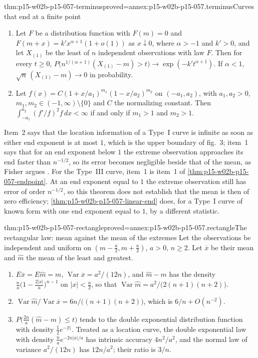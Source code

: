 \begin{hbtheorem}{thm:p15-w02b-p15-057-terminus}{proved=annex:p15-w02b-p15-057.terminus}{Curves that end at a finite point}
\begin{enumerate}
\item Let \(F\) be a distribution function with \(F(m)=0\) and
 \(F(m+x)=k'x^{\alpha+1}(1+o(1))\) as \(x\downarrow0\), where
 \(\alpha>-1\) and \(k'>0\), and let \(X_{(1)}\) be the least of \(n\)
 independent observations with law \(F\). Then for every \(t\geq0\),
 \(P\bigl(n^{1/(\alpha+1)}(X_{(1)}-m)>t\bigr)\to\exp(-k't^{\alpha+1})\).
 If \(\alpha<1\), \(\sqrt n\,(X_{(1)}-m)\to0\) in probability.
\item Let \(f(x)=C(1+x/a_1)^{m_1}(1-x/a_2)^{m_2}\) on \((-a_1,a_2)\), with
 \(a_1,a_2>0\), \(m_1,m_2\in(-1,\infty)\setminus\{0\}\) and \(C\) the
 normalizing constant. Then
 \(\int_{-a_1}^{a_2}(f'/f)^2f\,dx<\infty\) if and only if \(m_1>1\) and
 \(m_2>1\).
\end{enumerate}
\end{hbtheorem}

Item~2 says that the location information of a Type~I curve is infinite as
soon as either end exponent is at most \(1\), which is the upper boundary of
fig.~3; item~1 says that for an end exponent below \(1\) the extreme
observation approaches its end faster than \(n^{-1/2}\), so its error
becomes negligible beside that of the mean, as Fisher argues
\cite[p.~348]{Fisher1922Foundations}. For the Type~III curve, item~1 is
item~1 of \cref{thm:p15-w02b-p15-057-endpoint}. At an end exponent equal
to \(1\) the extreme observation still has error of order \(n^{-1/2}\), so
this theorem does not establish that the mean is then of zero efficiency;
\cref{thm:p15-w02b-p15-057-linear-end} does, for a Type~I curve of known
form with one end exponent equal to \(1\), by a different statistic.

\begin{hbtheorem}{thm:p15-w02b-p15-057-rectangle}{proved=annex:p15-w02b-p15-057.rectangle}{The rectangular law: mean against the mean of the extremes}
Let the observations be independent and uniform on
\((m-\frac a2,m+\frac a2)\), \(a>0\), \(n\geq2\). Let \(\overline x\) be
their mean and \(\hat m\) the mean of the least and greatest.
\begin{enumerate}
\item \(E\overline x=E\hat m=m\), \(\operatorname{Var}\overline x
 =a^2/(12n)\), and \(\hat m-m\) has the density
 \(\frac na\bigl(1-\frac{2|x|}a\bigr)^{n-1}\) on \(|x|<\frac a2\), so that
 \(\operatorname{Var}\hat m=a^2/\bigl(2(n+1)(n+2)\bigr)\).
\item \(\operatorname{Var}\hat m/\operatorname{Var}\overline x
 =6n/\bigl((n+1)(n+2)\bigr)\), which is \(6/n+O(n^{-2})\).
\item \(P\bigl(\frac{2n}a(\hat m-m)\leq t\bigr)\) tends to the double
 exponential distribution function with density \(\frac12e^{-|t|}\).
 Treated as a location curve, the double exponential law with density
 \(\frac na e^{-2n|x|/a}\) has intrinsic accuracy \(4n^2/a^2\), and the
 normal law of variance \(a^2/(12n)\) has \(12n/a^2\); their ratio is
 \(3/n\).
\end{enumerate}
\end{hbtheorem}

